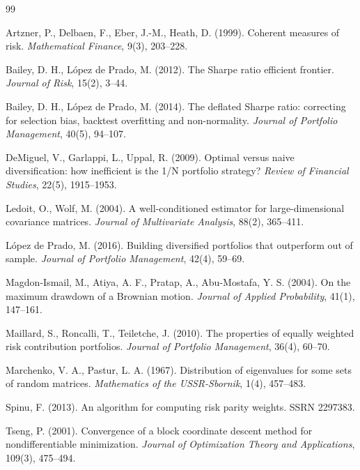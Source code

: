 \documentclass[11pt,a4paper]{article}
\theoremstyle{pdef}
\theoremstyle{pstate}
\begin{document}
\begin{thebibliography}{99}\small
\setlength{\itemsep}{2pt}

Artzner, P., Delbaen, F., Eber, J.-M., Heath, D. (1999). Coherent measures of risk.
\emph{Mathematical Finance}, 9(3), 203--228.

Bailey, D. H., López de Prado, M. (2012). The Sharpe ratio efficient frontier.
\emph{Journal of Risk}, 15(2), 3--44.

Bailey, D. H., López de Prado, M. (2014). The deflated Sharpe ratio: correcting for
selection bias, backtest overfitting and non-normality. \emph{Journal of Portfolio
Management}, 40(5), 94--107.

DeMiguel, V., Garlappi, L., Uppal, R. (2009). Optimal versus naive diversification: how
inefficient is the 1/N portfolio strategy? \emph{Review of Financial Studies}, 22(5),
1915--1953.

Ledoit, O., Wolf, M. (2004). A well-conditioned estimator for large-dimensional
covariance matrices. \emph{Journal of Multivariate Analysis}, 88(2), 365--411.

López de Prado, M. (2016). Building diversified portfolios that outperform out of
sample. \emph{Journal of Portfolio Management}, 42(4), 59--69.

Magdon-Ismail, M., Atiya, A. F., Pratap, A., Abu-Mostafa, Y. S. (2004). On the maximum
drawdown of a Brownian motion. \emph{Journal of Applied Probability}, 41(1), 147--161.

Maillard, S., Roncalli, T., Teiletche, J. (2010). The properties of equally weighted
risk contribution portfolios. \emph{Journal of Portfolio Management}, 36(4), 60--70.

Marchenko, V. A., Pastur, L. A. (1967). Distribution of eigenvalues for some sets of
random matrices. \emph{Mathematics of the USSR-Sbornik}, 1(4), 457--483.

Spinu, F. (2013). An algorithm for computing risk parity weights. SSRN 2297383.

Tseng, P. (2001). Convergence of a block coordinate descent method for nondifferentiable
minimization. \emph{Journal of Optimization Theory and Applications}, 109(3), 475--494.

\end{thebibliography}
\end{document}
